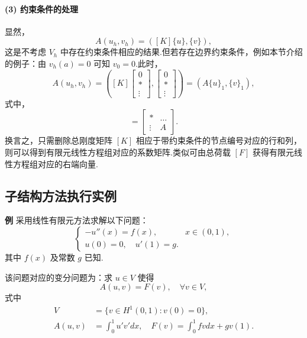 \paragraph{(3) 约束条件的处理}
显然，
\begin{equation*}
A(u_h, v_h) = ([K]\{u\}, \{v\}),
\end{equation*}
这是不考虑 $V_h$ 中存在约束条件相应的结果.但若存在边界约束条件，例如本节介绍的例子：由 $v_h(a) = 0$ 可知 $v_0 = 0$.此时，
\begin{equation*}
A(u_h, v_h) = \left( [K] \begin{bmatrix} 0 \\ * \\ \vdots \end{bmatrix}, \begin{bmatrix} 0 \\ * \\ \vdots \end{bmatrix} \right) = (A\{u\}_1, \{v\}_1),
\end{equation*}
式中，
\begin{equation*}
[K] = \begin{bmatrix} * & \dots \\ \vdots & A \end{bmatrix}.
\end{equation*}
换言之，只需删除总刚度矩阵 $[K]$ 相应于带约束条件的节点编号对应的行和列，则可以得到有限元线性方程组对应的系数矩阵.类似可由总荷载 $[F]$ 获得有限元线性方程组对应的右端向量.

\subsection{子结构方法执行实例}

\textbf{例} 采用线性有限元方法求解以下问题：
\begin{equation}
\begin{cases}
-u''(x) = f(x), & x \in (0,1), \\
u(0) = 0, \quad u'(1) = g.
\end{cases}
\end{equation}
其中 $f(x)$ 及常数 $g$ 已知.

该问题对应的变分问题为：求 $u \in V$ 使得
\begin{equation}
A(u, v) = F(v), \quad \forall v \in V,
\end{equation}
式中
\begin{align*}
V &= \{v \in H^1(0,1) : v(0) = 0\}, \\
A(u,v) &= \int_0^1 u' v' dx, \quad F(v) = \int_0^1 f v dx + g v(1).
\end{align*}

